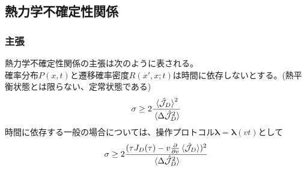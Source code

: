 \documentclass{ltjsarticle}
\begin{document}
\subsection{熱力学不確定性関係}
\subsubsection{主張}
熱力学不確定性関係の主張は次のように表される。\\
確率分布$P(x,t)$と遷移確率密度$R(x',x;t)$は時間に依存しないとする。(熱平衡状態とは限らない、定常状態である)
\begin{align}
  \sigma\ge 2\frac{\ev*{\hat{\mathcal{J}}_D}^2}{\ev*{\Delta\hat{\mathcal{J}}_D^2}}
  \label{eq:thermal_uncertain_steady}
\end{align}
時間に依存する一般の場合については、操作プロトコル$\bm{\lambda}=\bm{\lambda}(vt)$として
\begin{align}
  \sigma\ge 2\frac{(\tau J_D(\tau)-v\pdv{v}\ev*{\hat{\mathcal{J}}_D})^2}{\ev*{\Delta\hat{\mathcal{J}}_D^2}}
  \label{eq:thermal_uncertain_general}
\end{align}
\end{document}
